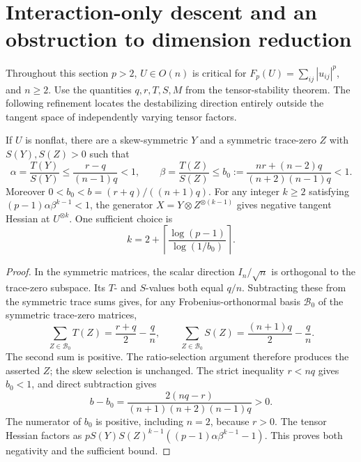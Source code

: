 \section{Interaction-only descent and an obstruction to dimension reduction}
\label{sec:interaction-descent}

Throughout this section $p>2$, $U\in O(n)$ is critical for
$F_p(U)=\sum_{ij}|u_{ij}|^p$, and $n\ge2$. Use the quantities
$q,r,T,S,M$ from the tensor-stability theorem. The following refinement
locates the destabilizing direction entirely outside the tangent space
of independently varying tensor factors.

\begin{proposition}
If $U$ is nonflat, there are a skew-symmetric $Y$ and a symmetric
trace-zero $Z$ with $S(Y),S(Z)>0$ such that
\[
 \alpha=\frac{T(Y)}{S(Y)}\le\frac{r-q}{(n-1)q}<1,
 \qquad
 \beta=\frac{T(Z)}{S(Z)}\le
 b_0:=\frac{nr+(n-2)q}{(n+2)(n-1)q}<1.
\]
Moreover $0<b_0<b=(r+q)/((n+1)q)$. For any integer $k\ge2$ satisfying
$(p-1)\alpha\beta^{k-1}<1$, the generator
$X=Y\otimes Z^{\otimes(k-1)}$ gives negative tangent Hessian at
$U^{\otimes k}$. One sufficient choice is
\[
 k=2+\left\lceil\frac{\log(p-1)}{\log(1/b_0)}\right\rceil.
\]
\end{proposition}
\begin{proof}
In the symmetric matrices, the scalar direction $I_n/\sqrt n$ is
orthogonal to the trace-zero subspace. Its $T$- and $S$-values both
equal $q/n$. Subtracting these from the symmetric trace sums gives,
for any Frobenius-orthonormal basis $\mathcal B_0$ of the symmetric
trace-zero matrices,
\[
 \sum_{Z\in\mathcal B_0}T(Z)=\frac{r+q}{2}-\frac qn,
 \qquad
 \sum_{Z\in\mathcal B_0}S(Z)=\frac{(n+1)q}{2}-\frac qn.
\]
The second sum is positive. The ratio-selection argument therefore
produces the asserted $Z$; the skew selection is unchanged.
The strict inequality $r<nq$ gives $b_0<1$, and direct subtraction gives
\[
 b-b_0=\frac{2(nq-r)}{(n+1)(n+2)(n-1)q}>0.
\]
The numerator of $b_0$ is positive, including $n=2$, because $r>0$.
The tensor Hessian factors as
$pS(Y)S(Z)^{k-1}((p-1)\alpha\beta^{k-1}-1)$.
This proves both negativity and the sufficient bound.
\end{proof}

